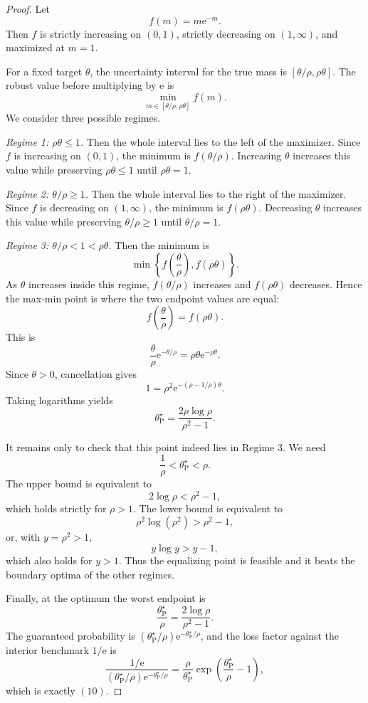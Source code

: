 \documentclass[11pt,a4paper]{article}
\newcommand{\e}{\mathrm e}
\begin{document}
\begin{proof}
Let
\[
  f(m)=m\e^{-m}.
\]
Then \(f\) is strictly increasing on \((0,1)\), strictly decreasing on
\((1,\infty)\), and maximized at \(m=1\).

For a fixed target \(\theta\), the uncertainty interval for the true mass is
\([\theta/\rho,\rho\theta]\).  The robust value before multiplying by \(\e\) is
\[
  \min_{m\in[\theta/\rho,\rho\theta]}f(m).
\]
We consider three possible regimes.

\medskip
\noindent\emph{Regime 1: \(\rho\theta\le1\).}
Then the whole interval lies to the left of the maximizer.  Since \(f\) is
increasing on \((0,1)\), the minimum is \(f(\theta/\rho)\).  Increasing
\(\theta\) increases this value while preserving \(\rho\theta\le1\) until
\(\rho\theta=1\).

\medskip
\noindent\emph{Regime 2: \(\theta/\rho\ge1\).}
Then the whole interval lies to the right of the maximizer.  Since \(f\) is
decreasing on \((1,\infty)\), the minimum is \(f(\rho\theta)\).  Decreasing
\(\theta\) increases this value while preserving \(\theta/\rho\ge1\) until
\(\theta/\rho=1\).

\medskip
\noindent\emph{Regime 3: \(\theta/\rho<1<\rho\theta\).}
Then the minimum is
\[
  \min\left\{f\left(\frac{\theta}{\rho}\right),f(\rho\theta)\right\}.
\]
As \(\theta\) increases inside this regime,
\(f(\theta/\rho)\) increases and \(f(\rho\theta)\) decreases.  Hence the
max-min point is where the two endpoint values are equal:
\[
  f\left(\frac{\theta}{\rho}\right)=f(\rho\theta).
\]
This is
\[
  \frac{\theta}{\rho}\e^{-\theta/\rho}
  =
  \rho\theta\e^{-\rho\theta}.
\]
Since \(\theta>0\), cancellation gives
\[
  1=\rho^2\e^{-(\rho-1/\rho)\theta}.
\]
Taking logarithms yields
\[
  \theta^\star_{\mathrm P}
  =\frac{2\rho\log\rho}{\rho^2-1}.
\]

It remains only to check that this point indeed lies in Regime 3.  We need
\[
  \frac1\rho<\theta^\star_{\mathrm P}<\rho.
\]
The upper bound is equivalent to
\[
  2\log\rho<\rho^2-1,
\]
which holds strictly for \(\rho>1\).  The lower bound is equivalent to
\[
  \rho^2\log(\rho^2)>\rho^2-1,
\]
or, with \(y=\rho^2>1\),
\[
  y\log y>y-1,
\]
which also holds for \(y>1\).  Thus the equalizing point is feasible and it
beats the boundary optima of the other regimes.

Finally, at the optimum the worst endpoint is
\[
  \frac{\theta^\star_{\mathrm P}}{\rho}
  =
  \frac{2\log\rho}{\rho^2-1}.
\]
The guaranteed probability is
\((\theta^\star_{\mathrm P}/\rho)\e^{-\theta^\star_{\mathrm P}/\rho}\), and the
loss factor against the interior benchmark \(1/\e\) is
\[
  \frac{1/\e}
  {(\theta^\star_{\mathrm P}/\rho)\e^{-\theta^\star_{\mathrm P}/\rho}}
  =
  \frac{\rho}{\theta^\star_{\mathrm P}}
  \exp\left(\frac{\theta^\star_{\mathrm P}}{\rho}-1\right),
\]
which is exactly \((10)\).
\end{proof}
\end{document}
